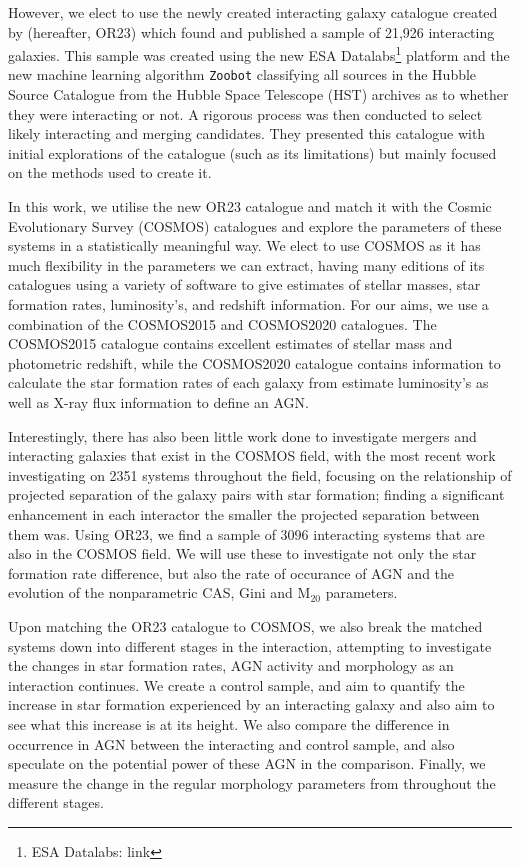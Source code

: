 \documentclass[fleqn,usenatbib]{mnras}
\begin{document}
 However, we elect to use the newly created interacting galaxy catalogue created by \citet{2023ApJ...948...40O} (hereafter, OR23) which found and published a sample of 21,926 interacting galaxies. This sample was created using the new ESA Datalabs\footnote{ESA Datalabs: link} platform and the new machine learning algorithm \texttt{Zoobot} \citep{2022MNRAS.509.3966W, 2023JOSS....8.5312W} classifying all sources in the Hubble Source Catalogue from the Hubble Space Telescope (HST) archives as to whether they were interacting or not. A rigorous process was then conducted to select likely interacting and merging candidates. They presented this catalogue with initial explorations of the catalogue (such as its limitations) but mainly focused on the methods used to create it.

 In this work, we utilise the new OR23 catalogue and match it with the Cosmic Evolutionary Survey (COSMOS) catalogues and explore the parameters of these systems in a statistically meaningful way. We elect to use COSMOS as it has much flexibility in the parameters we can extract, having many editions of its catalogues using a variety of software to give estimates of stellar masses, star formation rates, luminosity's, and redshift information. For our aims, we use a combination of the COSMOS2015 \citep{2016ApJS..224...24L} and COSMOS2020 \citep{2022ApJS..258...11W} catalogues. The COSMOS2015 catalogue contains excellent estimates of stellar mass and photometric redshift, while the COSMOS2020 catalogue contains information to calculate the star formation rates of each galaxy from estimate luminosity's as well as X-ray flux information to define an AGN. 
 
 Interestingly, there has also been little work done to investigate mergers and interacting galaxies that exist in the COSMOS field, with the most recent work \citet{2022ApJ...940....4S} investigating on 2351 systems throughout the field, focusing on the relationship of projected separation of the galaxy pairs with star formation; finding a significant enhancement in each interactor the smaller the projected separation between them was. Using OR23, we find a sample of 3096 interacting systems that are also in the COSMOS field. We will use these to investigate not only the star formation rate difference, but also the rate of occurance of AGN and the evolution of the nonparametric CAS, Gini and M$_{20}$ parameters.
 
 Upon matching the OR23 catalogue to COSMOS, we also break the matched systems down into different stages in the interaction, attempting to investigate the changes in star formation rates, AGN activity and morphology as an interaction continues. We create a control sample, and aim to quantify the increase in star formation experienced by an interacting galaxy and also aim to see what this increase is at its height. We also compare the difference in occurrence in AGN between the interacting and control sample, and also speculate on the potential power of these AGN in the comparison. Finally, we measure the change in the regular morphology parameters from \citet{2004AJ....128..163L} throughout the different stages.
\end{document}
